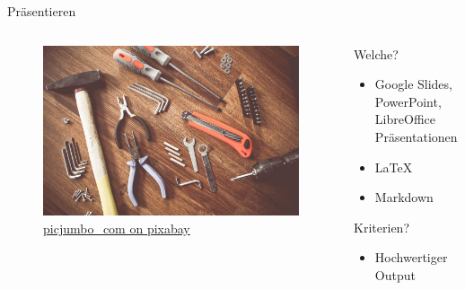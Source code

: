 \begin{frame}[t]{Präsentieren}
    \begin{columns}[t]
        \begin{column}{0.29\textwidth}      
            \vspace{-3em} 
            \begin{figure}[t]
                \begin{flushleft}
                    \includegraphics[height=0.8\textheight,trim={0 0 25cm 0},clip]{graphics/tools-864983_1280.jpg}         
                    \caption*{\href{https://pixabay.com/de/photos/werkzeuge-konstruieren-boot-864983/}{picjumbo\_com on pixabay}}    
                \end{flushleft}                
                      
            \end{figure}
        \end{column}        
        \begin{column}{0.7\textwidth}
            Welche?
            \begin{itemize}[]
                \item Google Slides, PowerPoint, LibreOffice Präsentationen
                \item \LaTeX
                \item Markdown
            \end{itemize}
            Kriterien?
            \begin{itemize}[]
                \item Hochwertiger Output
            \end{itemize}
        \end{column}
    \end{columns}
\end{frame}

